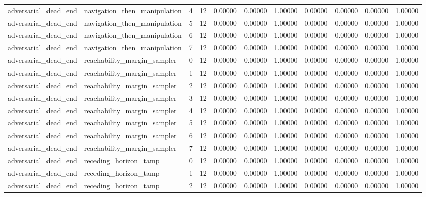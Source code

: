\documentclass{article}
\begin{document}
\begin{table}[tbp]
{\begin{tabular}{lllllllllll}
adversarial\_dead\_end & navigation\_then\_manipulation & 4 & 12 & 0.00000 & 0.00000 & 1.00000 & 0.00000 & 0.00000 & 0.00000 & 1.00000 \\
adversarial\_dead\_end & navigation\_then\_manipulation & 5 & 12 & 0.00000 & 0.00000 & 1.00000 & 0.00000 & 0.00000 & 0.00000 & 1.00000 \\
adversarial\_dead\_end & navigation\_then\_manipulation & 6 & 12 & 0.00000 & 0.00000 & 1.00000 & 0.00000 & 0.00000 & 0.00000 & 1.00000 \\
adversarial\_dead\_end & navigation\_then\_manipulation & 7 & 12 & 0.00000 & 0.00000 & 1.00000 & 0.00000 & 0.00000 & 0.00000 & 1.00000 \\
adversarial\_dead\_end & reachability\_margin\_sampler & 0 & 12 & 0.00000 & 0.00000 & 1.00000 & 0.00000 & 0.00000 & 0.00000 & 1.00000 \\
adversarial\_dead\_end & reachability\_margin\_sampler & 1 & 12 & 0.00000 & 0.00000 & 1.00000 & 0.00000 & 0.00000 & 0.00000 & 1.00000 \\
adversarial\_dead\_end & reachability\_margin\_sampler & 2 & 12 & 0.00000 & 0.00000 & 1.00000 & 0.00000 & 0.00000 & 0.00000 & 1.00000 \\
adversarial\_dead\_end & reachability\_margin\_sampler & 3 & 12 & 0.00000 & 0.00000 & 1.00000 & 0.00000 & 0.00000 & 0.00000 & 1.00000 \\
adversarial\_dead\_end & reachability\_margin\_sampler & 4 & 12 & 0.00000 & 0.00000 & 1.00000 & 0.00000 & 0.00000 & 0.00000 & 1.00000 \\
adversarial\_dead\_end & reachability\_margin\_sampler & 5 & 12 & 0.00000 & 0.00000 & 1.00000 & 0.00000 & 0.00000 & 0.00000 & 1.00000 \\
adversarial\_dead\_end & reachability\_margin\_sampler & 6 & 12 & 0.00000 & 0.00000 & 1.00000 & 0.00000 & 0.00000 & 0.00000 & 1.00000 \\
adversarial\_dead\_end & reachability\_margin\_sampler & 7 & 12 & 0.00000 & 0.00000 & 1.00000 & 0.00000 & 0.00000 & 0.00000 & 1.00000 \\
adversarial\_dead\_end & receding\_horizon\_tamp & 0 & 12 & 0.00000 & 0.00000 & 1.00000 & 0.00000 & 0.00000 & 0.00000 & 1.00000 \\
adversarial\_dead\_end & receding\_horizon\_tamp & 1 & 12 & 0.00000 & 0.00000 & 1.00000 & 0.00000 & 0.00000 & 0.00000 & 1.00000 \\
adversarial\_dead\_end & receding\_horizon\_tamp & 2 & 12 & 0.00000 & 0.00000 & 1.00000 & 0.00000 & 0.00000 & 0.00000 & 1.00000 \\

\end{tabular}}
\end{table}
\end{document}

